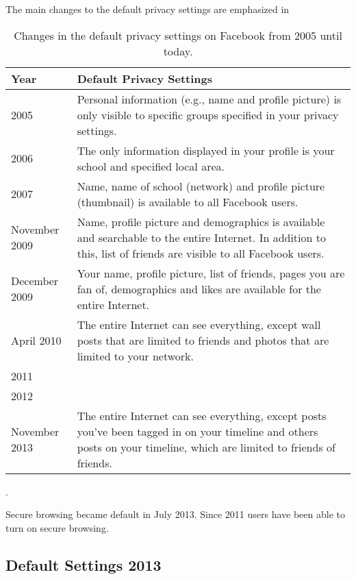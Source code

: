 The main changes to the default privacy settings are emphasized in\begin{center}
\begin{table}[!ht]
\caption{\label{tab:dps}Changes in the default privacy settings on Facebook from 2005 until today. \cite{EvoPriv,PrivTimeline}}
    \begin{tabular}{ | l | p{9cm} |}
    \hline
    \textbf{Year} & \textbf{Default Privacy Settings} \\ 
    \hline
    2005 & Personal information (e.g., name and profile picture) is 	only visible to specific groups specified in your privacy 			settings.\\ 
    \hline
    2006 & The only information displayed in your profile is your 		school and specified local area. \\ 
    \hline
    2007 & Name, name of school (network) and profile picture 			(thumbnail) is available to all Facebook users.\\
    \hline
    November 2009 & Name, profile picture and demographics is 			available and searchable to the entire Internet. In addition to 	this, list of friends are visible to all Facebook users.\\
	\hline
    December 2009 & Your name, profile picture, list of friends, 		pages you are fan of, demographics and likes are available for 		the entire Internet.\\
    \hline
    April 2010 & The entire Internet can see everything, except 		wall posts that are limited to friends and photos that are 			limited to your network. \\
    \hline
    2011 &  \\
    \hline
    2012 & \\
    \hline
    November 2013 & The entire Internet can see everything, except posts you've been tagged in on your timeline and others posts on your timeline, which are limited to friends of friends. \\ 
    \hline
    \end{tabular}
   \end{table}
\end{center} . 

Secure browsing became default in July 2013. Since 2011 users have been able to turn on secure browsing.  \cite{secureBrowsing}

\subsection{Default Settings 2013}
\label{subsec:default2013}

